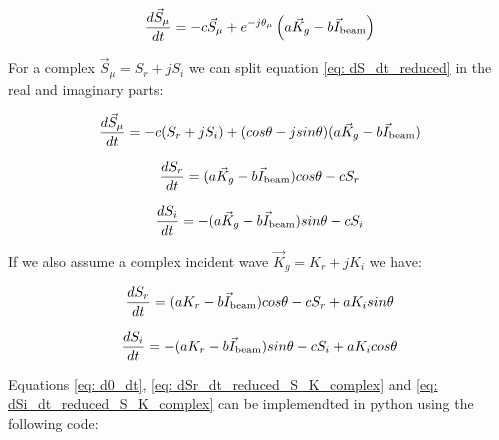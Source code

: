 \documentclass[a4paper,12pt]{article}
\begin{document}
\begin{equation}
  \frac{d\vec{S}_{\mu}}{dt} = -c\vec{S}_{\mu} + e^{-j\theta_{\mu}}\left(a\vec{K}_g - b\vec{I}_{\rm beam} \right)
\label{eq: dS_dt_reduced}
\end{equation}

For a complex $\vec{S}_{\mu}=S_r+jS_i$ we can split equation \ref{eq: dS_dt_reduced} in the real and imaginary parts:

\begin{equation}
  \frac{d\vec{S}_{\mu}}{dt} = -c(S_r+jS_i) + (cos\theta-jsin\theta)(a\vec{K}_g - b\vec{I}_{\rm beam})
\label{eq: dS_dt_reduced_Scomplex}
\end{equation}

\begin{equation}
  \frac{dS_r}{dt} = (a\vec{K}_g - b\vec{I}_{\rm beam})cos\theta-cS_r
\label{eq: dSr_dt_reduced_Scomplex}
\end{equation}

\begin{equation}
  \frac{dS_i}{dt} = -(a\vec{K}_g - b\vec{I}_{\rm beam})sin\theta-cS_i
\label{eq: dSi_dt_reduced_Scomplex}
\end{equation}

If we also assume a complex incident wave $\vec{K}_g=K_r+jK_i$ we have:

\begin{equation}
  \frac{dS_r}{dt} = (aK_r - b\vec{I}_{\rm beam})cos\theta-cS_r+aK_isin\theta
\label{eq: dSr_dt_reduced_S_K_complex}
\end{equation}

\begin{equation}
  \frac{dS_i}{dt} = -(aK_r - b\vec{I}_{\rm beam})sin\theta-cS_i+aK_icos\theta
\label{eq: dSi_dt_reduced_S_K_complex}
\end{equation}

Equations \ref{eq: d0_dt}, \ref{eq: dSr_dt_reduced_S_K_complex} and \ref{eq: dSi_dt_reduced_S_K_complex} can be implemendted in python using the following code:
\end{document}
